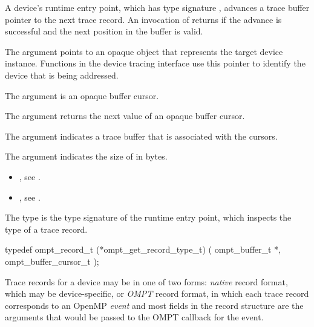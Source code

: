 \descr
A device's  runtime entry point, which has 
type signature , advances a trace buffer
pointer to the next trace record. An invocation of 
 returns  if the advance is 
successful and the next position in the buffer is valid.

\argdesc
The  argument points to an opaque object that represents
the target device instance. Functions in the device tracing interface
use this pointer to identify the device that is being addressed.

The  argument is an opaque buffer cursor.

The  argument returns the next value of an opaque buffer cursor.

The  argument indicates a trace buffer that is associated
with the cursors.

The argument  indicates the size of  in bytes.

\crossreferences
\begin{itemize}
\item {}, see .

\item {}, see .
\end{itemize}



\label{sec:ompt_get_record_type_t}

\summary
The  type is the type signature of the 
 runtime entry point, which inspects the 
type of a trace record.

\format
\begin{ccppspecific}
\begin{omptInquiry}
typedef ompt_record_t (*ompt_get_record_type_t) (
  ompt_buffer_t *,
  ompt_buffer_cursor_t 
);
\end{omptInquiry}
\end{ccppspecific}

\descr
Trace records for a device may be in one of two forms: \emph{native} 
record format, which may be device-specific, or \emph{OMPT} record 
format, in which each trace record corresponds to an OpenMP \emph{event} 
and most fields in the record structure are the arguments that would 
be passed to the OMPT callback for the event.

